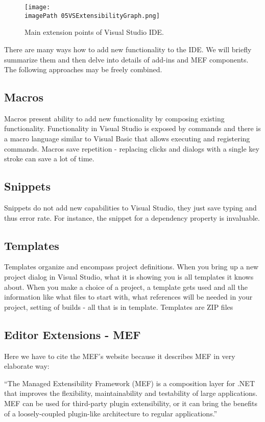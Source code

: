  \begin{figure}
	\centering
		\texttt{[image: \\imagePath 05VSExtensibilityGraph.png]}
		\caption{Main extension points of Visual Studio IDE. }
	\label{fig:05VSExtensibilityGraph}
\end{figure}

There are many ways how to add new functionality to the IDE. We will briefly summarize them and then delve into details of add-ins and MEF components. The following approaches may be freely combined.

\subsection{Macros}
Macros present ability to add new functionality by composing existing functionality. Functionality in Visual Studio is exposed by commands and  there is a macro language similar to Visual Basic  that allows executing and registering commands. Macros save repetition - replacing clicks and dialogs with a single key stroke can save a lot of time.

\subsection{Snippets}
Snippets do not add new capabilities to Visual Studio, they just save typing and thus error rate. For instance, the snippet for a dependency property is invaluable.

\subsection{Templates}
Templates organize and encompass project definitions. When you bring up a new project dialog in Visual Studio, what it is showing you is all templates it knows about. When you make a choice of a project, a template gets used and all the information like what files to start with, what references will be needed in your project, setting of builds - all that is in template. Templates are ZIP files

\subsection{Editor Extensions - MEF}
Here we have to cite the MEF's website because it describes MEF in very elaborate way:

``The Managed Extensibility Framework (MEF) is a composition layer for .NET that improves the flexibility, maintainability and testability of large applications. MEF can be used for third-party plugin extensibility, or it can bring the benefits of a loosely-coupled plugin-like architecture to regular applications.''\cite{MEFpage}

